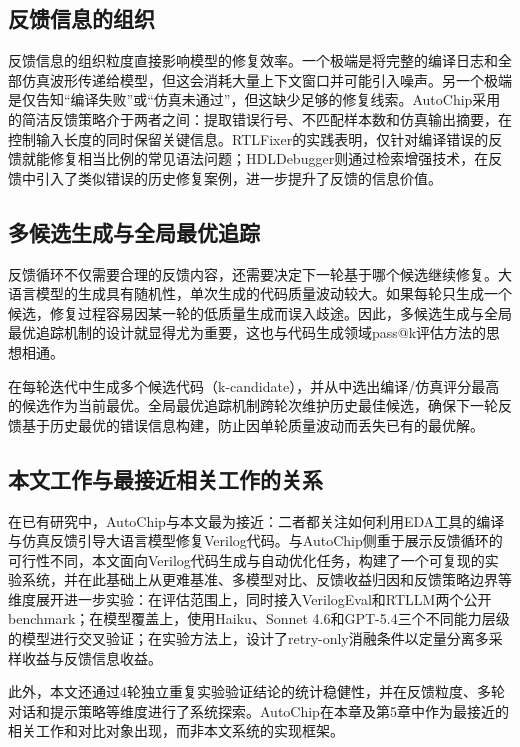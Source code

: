 \subsection{反馈信息的组织}

反馈信息的组织粒度直接影响模型的修复效率。一个极端是将完整的编译日志和全部仿真波形传递给模型，但这会消耗大量上下文窗口并可能引入噪声。另一个极端是仅告知``编译失败''或``仿真未通过''，但这缺少足够的修复线索。AutoChip\cite{autochip}采用的简洁反馈策略介于两者之间：提取错误行号、不匹配样本数和仿真输出摘要，在控制输入长度的同时保留关键信息。RTLFixer\cite{rtlfixer}的实践表明，仅针对编译错误的反馈就能修复相当比例的常见语法问题；HDLDebugger\cite{hdldebugger}则通过检索增强技术，在反馈中引入了类似错误的历史修复案例，进一步提升了反馈的信息价值。

\subsection{多候选生成与全局最优追踪}

反馈循环不仅需要合理的反馈内容，还需要决定下一轮基于哪个候选继续修复。大语言模型的生成具有随机性，单次生成的代码质量波动较大。如果每轮只生成一个候选，修复过程容易因某一轮的低质量生成而误入歧途。因此，多候选生成与全局最优追踪机制的设计就显得尤为重要，这也与代码生成领域pass@k评估方法\cite{codex}的思想相通。

在每轮迭代中生成多个候选代码（k-candidate），并从中选出编译/仿真评分最高的候选作为当前最优。全局最优追踪机制跨轮次维护历史最佳候选，确保下一轮反馈基于历史最优的错误信息构建，防止因单轮质量波动而丢失已有的最优解。

\subsection{本文工作与最接近相关工作的关系}

在已有研究中，AutoChip与本文最为接近：二者都关注如何利用EDA工具的编译与仿真反馈引导大语言模型修复Verilog代码。与AutoChip侧重于展示反馈循环的可行性不同，本文面向Verilog代码生成与自动优化任务，构建了一个可复现的实验系统，并在此基础上从更难基准、多模型对比、反馈收益归因和反馈策略边界等维度展开进一步实验：在评估范围上，同时接入VerilogEval和RTLLM两个公开benchmark；在模型覆盖上，使用Haiku、Sonnet 4.6和GPT-5.4三个不同能力层级的模型进行交叉验证；在实验方法上，设计了retry-only消融条件以定量分离多采样收益与反馈信息收益。

此外，本文还通过4轮独立重复实验验证结论的统计稳健性，并在反馈粒度、多轮对话和提示策略等维度进行了系统探索。AutoChip在本章及第5章中作为最接近的相关工作和对比对象出现，而非本文系统的实现框架。

